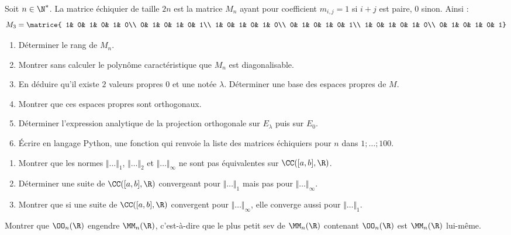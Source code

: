 \documentclass[french,11pt,twoside]{VcCours}
\begin{document}
\begin{Exercice}
  Soit $n\in\N^*$. 
  La matrice échiquier de taille $2n$ est la matrice 
  $M_n$ ayant pour coefficient $m_{i,j} = 1$ si $i+j$ est paire, $0$
  sinon. Ainsi :
  \[M_3=\matrice{
    1& 0& 1& 0& 1& 0\\
    0& 1& 0& 1& 0& 1\\
    1& 0& 1& 0& 1& 0\\
    0& 1& 0& 1& 0& 1\\
    1& 0& 1& 0& 1& 0\\
    0& 1& 0& 1& 0& 1}
  \]
  \begin{enumerate}
    \item Déterminer le rang de $M_n$.
    \item Montrer sans calculer le polynôme caractéristique que $M_n$ est diagonalisable.
    \item En déduire qu’il existe $2$ valeurs propres $0$ et une notée $\lambda$. 
      Déterminer une base des espaces propres de $M$.
    \item Montrer que ces espaces propres sont orthogonaux.
    \item Déterminer l’expression analytique de la projection orthogonale sur $E_{\lambda}$ puis sur $E_0$.
    \item Écrire en langage Python, une fonction qui renvoie la liste des matrices échiquiers pour $n$ dans ${1;\ldots;100}$.
  \end{enumerate}
\end{Exercice}


\begin{Exercice}
  \begin{enumerate}
    \item Montrer que les normes $\Vert\ldots\Vert_1$, $\Vert\ldots\Vert_2$ et $\Vert\ldots\Vert_{\infty}$ ne sont pas équivalentes sur $\CC([a,b],\R)$.
    \item Déterminer une suite de $\CC([a,b],\R)$ convergeant pour $\Vert\ldots\Vert_1$ mais pas pour $\Vert\ldots\Vert_{\infty}$.
    \item Montrer que si une suite de $\CC([a,b],\R)$ convergent pour $\Vert\ldots\Vert_{\infty}$, elle converge aussi pour $\Vert\ldots\Vert_1$. 
  \end{enumerate}
\end{Exercice}


\begin{Exercice}
  Montrer que $\OO_n(\R)$ engendre $\MM_n(\R)$, c’est-à-dire que le plus petit 
  sev de $\MM_n(\R)$ contenant $\OO_n(\R)$ est $\MM_n(\R)$ lui-même.
\end{Exercice}
\end{document}
